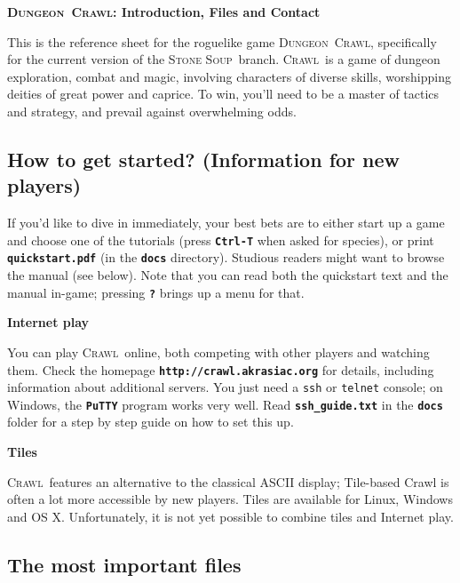 \documentclass[a4paper,10pt]{article}
\newcommand{\key}[1]{{{\texttt{\textbf{#1}}}}} %
\newcommand{\sex}[1]{{{\textbf{#1}}}} %
\newcommand{\slsl}{/\hspace{-0.2em}/} %
\newcommand{\crawl}{\textsc{Crawl}}
\newcommand{\dungeon}{\textsc{Dungeon}}
\newcommand{\soup}{\textsc{Stone Soup}}
\newcommand{\para}{\vspace{1.5ex}}
\begin{document}
\begin{center}\textbf{\LARGE
\dungeon\ \crawl: Introduction, Files  and Contact
}\end{center}

This is the reference sheet for the roguelike game \dungeon\ \crawl,
specifically for the current version of the \soup\ branch. 
\crawl\ is a game of dungeon exploration, combat and magic, involving
characters of diverse skills, worshipping deities of great power and
caprice. To win, you'll need to be a master of tactics and strategy,
and prevail against overwhelming odds.

%

\subsection*{How to get started? (Information for new players)}

If you'd like to dive in immediately, your best bets are to either
start up a game and choose one of the tutorials (press \key{Ctrl-T} 
when asked for species), or print \key{quickstart.pdf} (in the 
\key{docs} directory). Studious readers might want to browse the manual
(see below). Note that you can read both the quickstart text and the
manual in-game; pressing \key{?} brings up a menu for that.

\para

\sex{Internet play}

You can play \crawl\ online, both competing with other players and watching 
them. Check the homepage \key{http:\slsl crawl.akrasiac.org} for details, 
including information about additional servers. You just need a \texttt{ssh}
or \texttt{telnet} console; on Windows, the \key{PuTTY} program works very 
well. Read \key{ssh\_guide.txt} in the \key{docs} folder for a step by step 
guide on how to set this up.

\para 

\sex{Tiles}

\crawl\ features an alternative to the classical ASCII display; Tile-based
Crawl is often a lot more accessible by new players. Tiles are available for 
Linux, Windows and OS X.
Unfortunately, it is not yet possible to combine tiles and Internet play.

\subsection*{The most important files}
\end{document}
